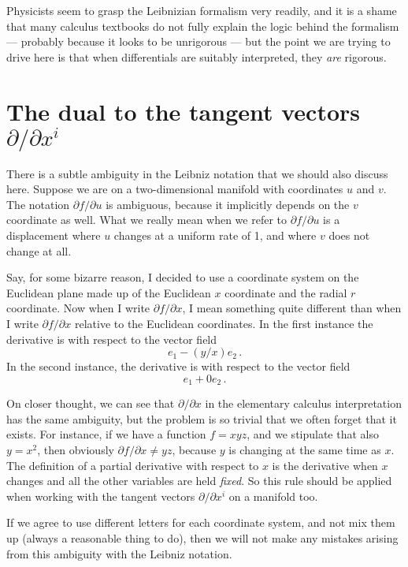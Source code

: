 \documentclass[12pt]{article}
\begin{document}
Physicists seem to grasp the Leibnizian formalism very readily,
and it is a shame that many calculus textbooks do not fully explain the logic
behind the formalism --- probably because it looks to be unrigorous --- 
but the point we are trying to drive here is that when differentials are suitably
interpreted, they \emph{are} rigorous.

\section*{The dual to the tangent vectors $\partial/\partial x^i$}
There is a subtle ambiguity in the Leibniz notation
that we should also discuss here.
Suppose we are on a two-dimensional manifold with coordinates $u$ and $v$. The notation $\partial f/\partial u$ is ambiguous, because it implicitly depends on the $v$ coordinate as well. What we really mean when we refer to $\partial f/\partial u$
is a displacement where $u$ changes at a uniform rate of 1, and where $v$ does not change at all. 

Say, for some bizarre reason, I decided to use a coordinate system on the Euclidean plane made up of the Euclidean $x$ coordinate and the radial $r$ coordinate. Now when I write $\partial f/\partial x$, I mean something quite different than when I write $\partial f/\partial x$ relative to the Euclidean coordinates.
In the first instance the derivative is with respect to the vector field
\[
e_1 - (y/x) e_2\,.
\]
In the second instance, the derivative is with respect to the vector field
\[
e_1 + 0 e_2\,.
\]

On closer thought, we can see that $\partial/\partial x$
in the elementary calculus interpretation
has the same ambiguity, but the problem is so trivial that
we often forget that it exists.
For instance, if we have a function $f = xyz$, and we stipulate
that also $y = x^2$,
then obviously $\partial f/\partial x \neq yz$, because $y$ is changing
at the same time as $x$.
The definition of a partial derivative with respect
to $x$
is the derivative when $x$ changes and all the other variables are held
\emph{fixed}.  So this rule should be applied when
working with the tangent vectors $\partial / \partial x^i$
on a manifold too.  

If we agree to use different letters for each coordinate system,
and not mix them up (always a reasonable thing to do),
then we will not make any mistakes arising from this ambiguity
with the Leibniz notation.
\end{document}
